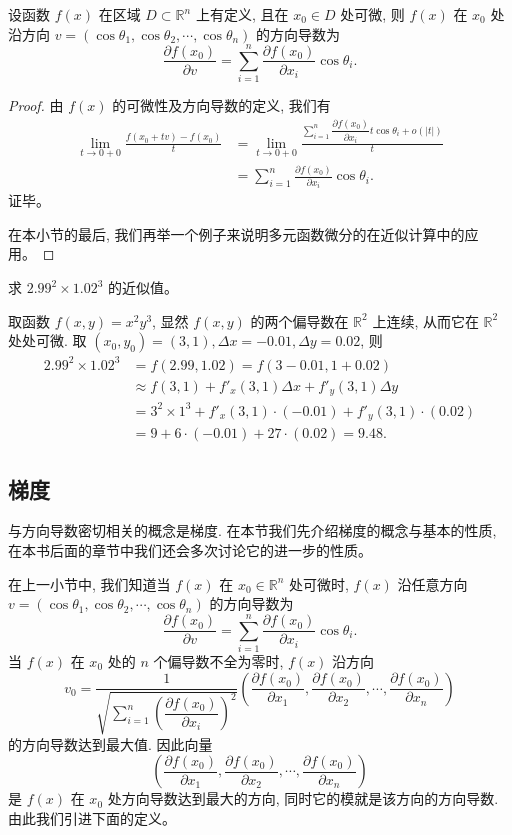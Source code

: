 \documentclass[UTF8,12pt,a4paper,fontset=fandol]{ctexart}
\begin{document}
\begin{theorem}\label{course-theorem-14-1-3}\quad 设函数 $f(x)$ 在区域 $D\subset\mathbb R^n$ 上有定义, 且在 $x_0\in D$ 处可微, 则 $f(x)$ 在 $x_0$ 处沿方向 $v=(\cos\theta_1,\cos\theta_2,\cdots,\cos\theta_n)$ 的方向导数为
\[
  \frac{\partial f(x_0)}{\partial v}
  =\sum_{i=1}^n\frac{\partial f(x_0)}{\partial x_i}\cos\theta_i.
\]

\end{theorem}
\begin{proof}\quad 由 $f(x)$ 的可微性及方向导数的定义, 我们有
\[
\begin{aligned}
  \lim_{t\to0+0}\frac{f(x_0+tv)-f(x_0)}{t}
  &=\lim_{t\to0+0}
  \frac{\sum\limits_{i=1}^n\dfrac{\partial f(x_0)}{\partial x_i}t\cos\theta_i+o(|t|)}{t}\\
  &=\sum_{i=1}^n\frac{\partial f(x_0)}{\partial x_i}\cos\theta_i.
\end{aligned}
\]
证毕。

在本小节的最后, 我们再举一个例子来说明多元函数微分的在近似计算中的应用。

\end{proof}
\begin{example}\label{course-example-14-1-6}\quad 求 $2.99^2\times1.02^3$ 的近似值。

\end{example}
\begin{solve}\quad 取函数 $f(x,y)=x^2y^3$, 显然 $f(x,y)$ 的两个偏导数在 $\mathbb R^2$ 上连续, 从而它在 $\mathbb R^2$ 处处可微. 取 $(x_0,y_0)=(3,1), \Delta x=-0.01, \Delta y=0.02$, 则
\[
\begin{aligned}
  2.99^2\times1.02^3
  &=f(2.99,1.02)=f(3-0.01,1+0.02)\\
  &\approx f(3,1)+f'_x(3,1)\Delta x+f'_y(3,1)\Delta y\\
  &=3^2\times1^3+f'_x(3,1)\cdot(-0.01)+f'_y(3,1)\cdot(0.02)\\
  &=9+6\cdot(-0.01)+27\cdot(0.02)=9.48.
\end{aligned}
\]

\end{solve}
\subsection{梯度}

与方向导数密切相关的概念是梯度. 在本节我们先介绍梯度的概念与基本的性质, 在本书后面的章节中我们还会多次讨论它的进一步的性质。

在上一小节中, 我们知道当 $f(x)$ 在 $x_0\in\mathbb R^n$ 处可微时, $f(x)$ 沿任意方向 $v=(\cos\theta_1,\cos\theta_2,\cdots,\cos\theta_n)$ 的方向导数为
\[
  \frac{\partial f(x_0)}{\partial v}=
  \sum_{i=1}^n\frac{\partial f(x_0)}{\partial x_i}\cos\theta_i.
\]
当 $f(x)$ 在 $x_0$ 处的 $n$ 个偏导数不全为零时, $f(x)$ 沿方向
\[
  v_0=
  \frac1{\sqrt{\sum\limits_{i=1}^n\left(\dfrac{\partial f(x_0)}{\partial x_i}\right)^2}}
  \left(\frac{\partial f(x_0)}{\partial x_1},\frac{\partial f(x_0)}{\partial x_2},\cdots,\frac{\partial f(x_0)}{\partial x_n}\right)
\]
的方向导数达到最大值. 因此向量
\[
  \left(\frac{\partial f(x_0)}{\partial x_1},\frac{\partial f(x_0)}{\partial x_2},\cdots,\frac{\partial f(x_0)}{\partial x_n}\right)
\]
是 $f(x)$ 在 $x_0$ 处方向导数达到最大的方向, 同时它的模就是该方向的方向导数. 由此我们引进下面的定义。
\end{document}

